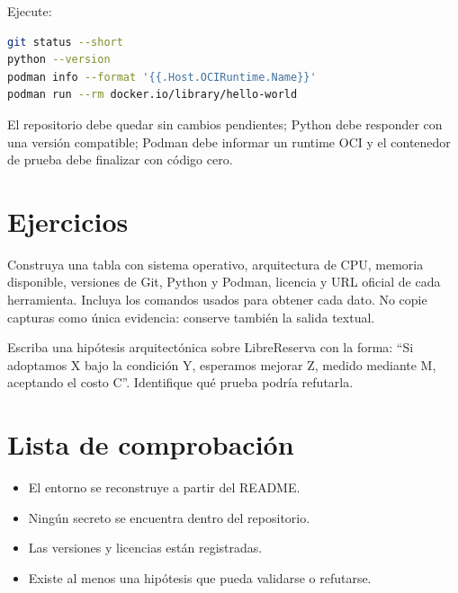 \begin{validacion}
Ejecute:
\begin{lstlisting}[language=bash]
git status --short
python --version
podman info --format '{{.Host.OCIRuntime.Name}}'
podman run --rm docker.io/library/hello-world
\end{lstlisting}
El repositorio debe quedar sin cambios pendientes; Python debe responder con una versión compatible; Podman debe informar un runtime OCI y el contenedor de prueba debe finalizar con código cero.
\end{validacion}

\section{Ejercicios}
\begin{ejercicio}[title={Ejercicio 1. Inventario verificable}]
Construya una tabla con sistema operativo, arquitectura de CPU, memoria disponible, versiones de Git, Python y Podman, licencia y URL oficial de cada herramienta. Incluya los comandos usados para obtener cada dato. No copie capturas como única evidencia: conserve también la salida textual.
\end{ejercicio}

\begin{ejercicio}[title={Ejercicio 2. Primera hipótesis}]
Escriba una hipótesis arquitectónica sobre LibreReserva con la forma: ``Si adoptamos X bajo la condición Y, esperamos mejorar Z, medido mediante M, aceptando el costo C''. Identifique qué prueba podría refutarla.
\end{ejercicio}

\section{Lista de comprobación}
\begin{itemize}
  \item El entorno se reconstruye a partir del README.
  \item Ningún secreto se encuentra dentro del repositorio.
  \item Las versiones y licencias están registradas.
  \item Existe al menos una hipótesis que pueda validarse o refutarse.
\end{itemize}
